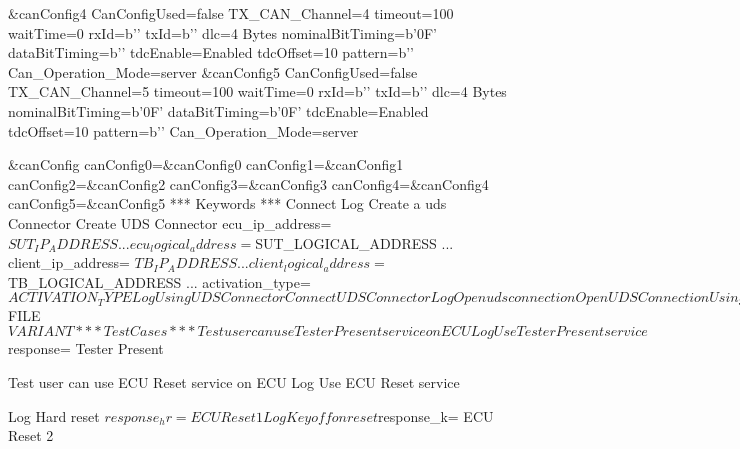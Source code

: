 \begin{robotcode}
&{canConfig4}    CanConfigUsed=false    TX_CAN_Channel=4    timeout=100    waitTime=0    rxId=b'\xFF'    txId=b''    dlc=4 Bytes    nominalBitTiming=b'\x0F'    dataBitTiming=b''    tdcEnable=Enabled    tdcOffset=10    pattern=b'\xAA\xBB\xCC\xDD{}'    Can_Operation_Mode=server
&{canConfig5}    CanConfigUsed=false    TX_CAN_Channel=5    timeout=100    waitTime=0    rxId=b''    txId=b''    dlc=4 Bytes    nominalBitTiming=b'\x0F'    dataBitTiming=b'\x0F'    tdcEnable=Enabled    tdcOffset=10    pattern=b'\xAA\xBB\xCC\xDD{}'    Can_Operation_Mode=server

&{canConfig}    canConfig0=&{canConfig0}    canConfig1=&{canConfig1}    canConfig2=&{canConfig2}    canConfig3=&{canConfig3}    canConfig4=&{canConfig4}    canConfig5=&{canConfig5}
*** Keywords ***
Connect
    Log    Create a uds Connector
    Create UDS Connector    ecu_ip_address= ${SUT_IP_ADDRESS}
    ...                     ecu_logical_address= ${SUT_LOGICAL_ADDRESS}
    ...                     client_ip_address= ${TB_IP_ADDRESS}
    ...                     client_logical_address= ${TB_LOGICAL_ADDRESS}
    ...                     activation_type= ${ACTIVATION_TYPE}
    Log    Using UDS Connector
    Connect UDS Connector
    Log    Open uds connection
    Open UDS Connection
    Using pdx

Disconnect
    Log    Close uds connection
    Close UDS Connection

Using pdx
    Load PDX    ${FILE}    ${VARIANT}

*** Test Cases ***
Test user can use Tester Present service on ECU
    Log    Use Tester Present service
    ${response}=    Tester Present

Test user can use ECU Reset service on ECU
    Log    Use ECU Reset service

    Log    Hard reset
    ${response_hr}=    ECU Reset    1

    Log    Key off on reset
    ${response_k}=    ECU Reset    2


\end{robotcode}
